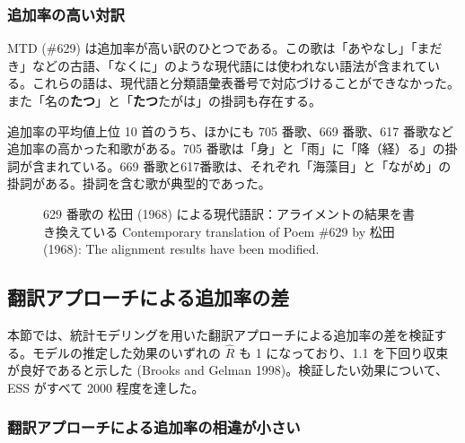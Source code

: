 \documentclass[
  letterpaper,
  DIV=11,
  numbers=noendperiod]{scrartcl}
\begin{document}
\subsubsection*{追加率の高い対訳}\label{ux8ffdux52a0ux7387ux306eux9ad8ux3044ux5bfeux8a33}

MTD (\#629)
は追加率が高い訳のひとつである。この歌は「あやなし」「まだき」などの古語、「なくに」のような現代語には使われない語法が含まれている。これらの語は、現代語と分類語彙表番号で対応づけることができなかった。
また「名の\textbf{たつ}」と「\textbf{たつ}たがは」の掛詞も存在する。

追加率の平均値上位 10 首のうち、ほかにも 705 番歌、669 番歌、617
番歌など追加率の高かった和歌がある。705
番歌は「身」と「雨」に「降（経）る」の掛詞が含まれている。669
番歌と617番歌は、それぞれ「海藻目」と「ながめ」の掛詞がある。掛詞を含む歌が典型的であった。

\begin{figure}


\caption{\label{fig-mtd-629}629 番歌の 松田 (1968)
による現代語訳：アライメントの結果を書き換えている Contemporary
translation of Poem \#629 by 松田 (1968): The alignment results have
been modified.}

\end{figure}%

\subsection{翻訳アプローチによる追加率の差}\label{ux7ffbux8a33ux30a2ux30d7ux30edux30fcux30c1ux306bux3088ux308bux8ffdux52a0ux7387ux306eux5dee}

本節では、統計モデリングを用いた翻訳アプローチによる追加率の差を検証する。モデルの推定した効果のいずれの
\(\hat{R}\) も 1 になっており、1.1 を下回り収束が良好であると示した
(Brooks and Gelman 1998)。検証したい効果について、ESS がすべて 2000
程度を達した。

\subsubsection*{翻訳アプローチによる追加率の相違が小さい}\label{ux7ffbux8a33ux30a2ux30d7ux30edux30fcux30c1ux306bux3088ux308bux8ffdux52a0ux7387ux306eux76f8ux9055ux304cux5c0fux3055ux3044}
\end{document}
